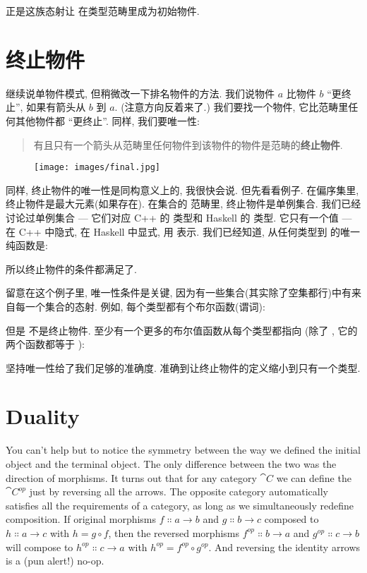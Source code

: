 正是这族态射让  在类型范畴里成为初始物件.

\section{终止物件}

继续说单物件模式, 但稍微改一下排名物件的方法. 我们说物件 $a$ 比物件 $b$ ``更终止'', 如果有箭头从 $b$ 到 $a$.
(注意方向反着来了.) 我们要找一个物件, 它比范畴里任何其他物件都 ``更终止''. 同样, 我们要唯一性:

\begin{quote}
  有且只有一个箭头从范畴里任何物件到该物件的物件是范畴的\textbf{终止物件}.
\end{quote}

\begin{figure}[H]
  \centering
  \texttt{[image: images/final.jpg]}
\end{figure}

\noindent
同样, 终止物件的唯一性是同构意义上的, 我很快会说. 但先看看例子. 在偏序集里, 终止物件是最大元素(如果存在). 在集合的
范畴里, 终止物件是单例集合. 我们已经讨论过单例集合 --- 它们对应 C++ 的  类型和 Haskell 的 \code{()} 类型.
它只有一个值 --- 在 C++ 中隐式, 在 Haskell 中显式, 用 \code{()} 表示. 我们已经知道, 从任何类型到 \code{()} 的唯一
纯函数是:

所以终止物件的条件都满足了.

留意在这个例子里, 唯一性条件是关键, 因为有一些集合(其实除了空集都行)中有来自每一个集合的态射.
例如, 每个类型都有个布尔函数(谓词):

但是  不是终止物件. 至少有一个更多的布尔值函数从每个类型都指向 
(除了 , 它的两个函数都等于 ):

坚持唯一性给了我们足够的准确度. 准确到让终止物件的定义缩小到只有一个类型.

\section{Duality}

You can't help but to notice the symmetry between the way we defined the
initial object and the terminal object. The only difference between the
two was the direction of morphisms. It turns out that for any category $\cat{C}$
we can define the  $\cat{C}^{op}$ just by
reversing all the arrows. The opposite category automatically satisfies
all the requirements of a category, as long as we simultaneously
redefine composition. If original morphisms
$f \Colon a \to b$ and $g \Colon b \to c$ composed
to $h \Colon a \to c$ with $h = g \circ f$, then the reversed
morphisms $f^{op} \Colon b \to a$ and $g^{op} \Colon c \to b$ will compose to
$h^{op} \Colon c \to a$ with $h^{op} = f^{op} \circ g^{op}$. And reversing
the identity arrows is a (pun alert!) no-op.


